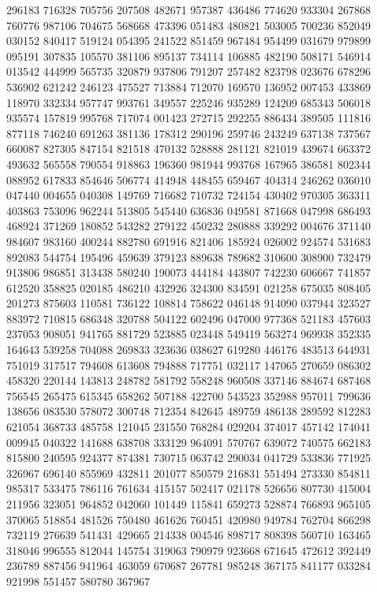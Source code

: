 {296183 716328 705756 207508 482671 957387 436486 774620 933304 267868 760776%
987106 704675 568668 473396 051483 480821 503005 700236 852049 030152 840417%
519124 054395 241522 851459 967484 954499 031679 979899 095191 307835 105570%
381106 895137 734114 106885 482190 508171 546914 013542 444999 565735 320879%
937806 791207 257482 823798 023676 678296 536902 621242 246123 475527 713884%
712070 169570 136952 007453 433869 118970 332334 957747 993761 349557 225246%
935289 124209 685343 506018 935574 157819 995768 717074 001423 272715 292255%
886434 389505 111816 877118 746240 691263 381136 178312 290196 259746 243249%
637138 737567 660087 827305 847154 821518 470132 528888 281121 821019 439674%
663372 493632 565558 790554 918863 196360 981944 993768 167965 386581 802344%
088952 617833 854646 506774 414948 448455 659467 404314 246262 036010 047440%
004655 040308 149769 716682 710732 724154 430402 970305 363311 403863 753096%
962244 513805 545440 636836 049581 871668 047998 686493 468924 371269 180852%
543282 279122 450232 280888 339292 004676 371140 984607 983160 400244 882780%
691916 821406 185924 026002 924574 531683 892083 544754 195496 459639 379123%
889638 789682 310600 308900 732479 913806 986851 313438 580240 190073 444184%
443807 742230 606667 741857 612520 358825 020185 486210 432926 324300 834591%
021258 675035 808405 201273 875603 110581 736122 108814 758622 046148 914090%
037944 323527 883972 710815 686348 320788 504122 602496 047000 977368 521183%
457603 237053 908051 941765 881729 523885 023448 549419 563274 969938 352335%
164643 539258 704088 269833 323636 038627 619280 446176 483513 644931 751019%
317517 794608 613608 794888 717751 032117 147065 270659 086302 458320 220144%
143813 248782 581792 558248 960508 337146 884674 687468 756545 265475 615345%
658262 507188 422700 543523 352988 957011 799636 138656 083530 578072 300748%
712354 842645 489759 486138 289592 812283 621054 368733 485758 121045 231550%
768284 029204 374017 457142 174041 009945 040322 141688 638708 333129 964091%
570767 639072 740575 662183 815800 240595 924377 874381 730715 063742 290034%
041729 533836 771925 326967 696140 855969 432811 201077 850579 216831 551494%
273330 854811 985317 533475 786116 761634 415157 502417 021178 526656 807730%
415004 211956 323051 964852 042060 101449 115841 659273 528874 766893 965105%
370065 518854 481526 750480 461626 760451 420980 949784 762704 866298 732119%
276639 541431 429665 214338 004546 898717 808398 560710 163465 318046 996555%
812044 145754 319063 790979 923668 671645 472612 392449 236789 887456 941964%
463059 670687 267781 985248 367175 841177 033284 921998 551457 580780 367967%
}
